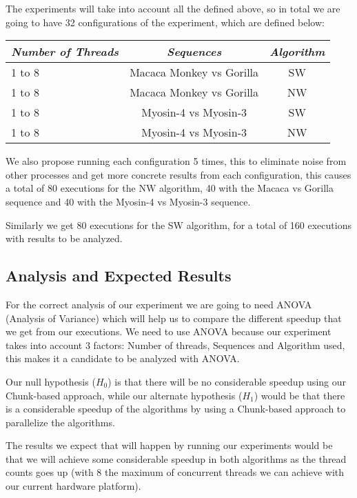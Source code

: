 \documentclass[journal]{IEEEtran}
\begin{document}
The experiments will take into account all the defined above, so in total we are going to have 32 configurations of the experiment, which are defined below:


\begin{center}
\begin{tabular}{|p{1.5cm}|c|c|}
\toprule
    \rowcolor{red!80} {\color{white} \emph{Number of Threads}} & {\color{white} \emph{Sequences}} & {\color{white} \emph{Algorithm}}\\\midrule
    
     1 to 8 & Macaca Monkey vs Gorilla & SW \\ \hline
     1 to 8 & Macaca Monkey vs Gorilla & NW \\ \hline
     1 to 8 & Myosin-4 vs Myosin-3 & SW \\ \hline
     1 to 8 & Myosin-4 vs Myosin-3 & NW \\ \hline

\bottomrule
\hline
\end{tabular}
\end{center}

We also propose running each configuration 5 times, this to eliminate noise from other processes and get more concrete results from each configuration, this causes a total of 80 executions for the NW algorithm, 40 with the Macaca vs Gorilla sequence and 40 with the Myosin-4 vs Myosin-3 sequence.

Similarly we get 80 executions for the SW algorithm, for a total of 160 executions with results to be analyzed.

\subsection{Analysis and Expected Results}

For the correct analysis of our experiment we are going to need ANOVA (Analysis of Variance) which will help us to compare the different speedup that we get from our executions. We need to use ANOVA because our experiment takes into account 3 factors: Number of threads, Sequences and Algorithm used, this makes it a candidate to be analyzed with ANOVA.

Our null hypothesis ($H_0$) is that there will be no considerable speedup using our Chunk-based approach, while our alternate hypothesis ($H_1$) would be that there is a considerable speedup of the algorithms by using a Chunk-based approach to parallelize the algorithms.

The results we expect that will happen by running our experiments would be that we will achieve some considerable speedup in both algorithms as the thread counts goes up (with 8 the maximum of concurrent threads we can achieve with our current hardware platform).
\end{document}
